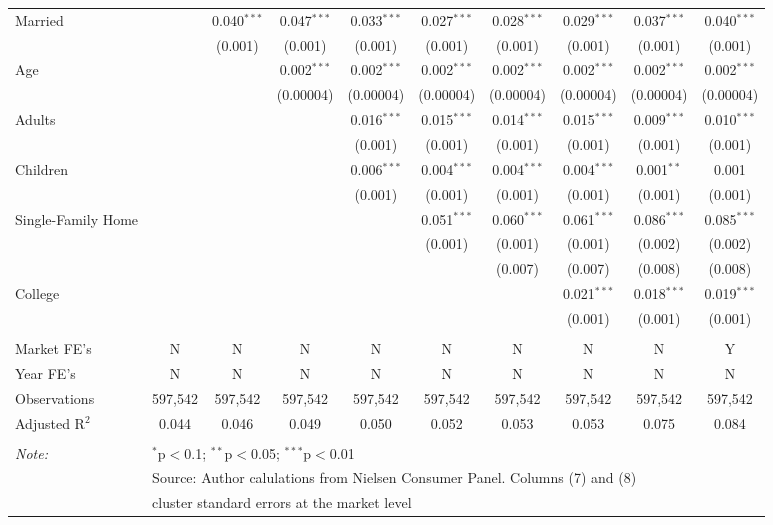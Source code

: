 \begin{table}[!htbp]
\begin{tabular}{@{\extracolsep{5pt}}lccccccccc}
  Married &  & 0.040$^{***}$ & 0.047$^{***}$ & 0.033$^{***}$ & 0.027$^{***}$ & 0.028$^{***}$ & 0.029$^{***}$ & 0.037$^{***}$ & 0.040$^{***}$ \\ 
  &  & (0.001) & (0.001) & (0.001) & (0.001) & (0.001) & (0.001) & (0.001) & (0.001) \\ 
  Age &  &  & 0.002$^{***}$ & 0.002$^{***}$ & 0.002$^{***}$ & 0.002$^{***}$ & 0.002$^{***}$ & 0.002$^{***}$ & 0.002$^{***}$ \\ 
  &  &  & (0.00004) & (0.00004) & (0.00004) & (0.00004) & (0.00004) & (0.00004) & (0.00004) \\ 
  Adults &  &  &  & 0.016$^{***}$ & 0.015$^{***}$ & 0.014$^{***}$ & 0.015$^{***}$ & 0.009$^{***}$ & 0.010$^{***}$ \\ 
  &  &  &  & (0.001) & (0.001) & (0.001) & (0.001) & (0.001) & (0.001) \\ 
  Children &  &  &  & 0.006$^{***}$ & 0.004$^{***}$ & 0.004$^{***}$ & 0.004$^{***}$ & 0.001$^{**}$ & 0.001 \\ 
  &  &  &  & (0.001) & (0.001) & (0.001) & (0.001) & (0.001) & (0.001) \\ 
  Single-Family Home &  &  &  &  & 0.051$^{***}$ & 0.060$^{***}$ & 0.061$^{***}$ & 0.086$^{***}$ & 0.085$^{***}$ \\ 
  &  &  &  &  & (0.001) & (0.001) & (0.001) & (0.002) & (0.002) \\ 
  &  &  &  &  &  & (0.007) & (0.007) & (0.008) & (0.008) \\ 
  College &  &  &  &  &  &  & 0.021$^{***}$ & 0.018$^{***}$ & 0.019$^{***}$ \\ 
  &  &  &  &  &  &  & (0.001) & (0.001) & (0.001) \\ 
 \hline \\[-1.8ex] 
Market FE's & N & N & N & N & N & N & N & N & Y \\ 
Year FE's & N & N & N & N & N & N & N & N & N \\ 
Observations & 597,542 & 597,542 & 597,542 & 597,542 & 597,542 & 597,542 & 597,542 & 597,542 & 597,542 \\ 
Adjusted R$^{2}$ & 0.044 & 0.046 & 0.049 & 0.050 & 0.052 & 0.053 & 0.053 & 0.075 & 0.084 \\ 
\hline 
\hline \\[-1.8ex] 
\textit{Note:}  & \multicolumn{9}{l}{$^{*}$p$<$0.1; $^{**}$p$<$0.05; $^{***}$p$<$0.01} \\ 
 & \multicolumn{9}{l}{Source: Author calulations from Nielsen Consumer Panel. Columns (7) and (8) } \\ 
 & \multicolumn{9}{l}{cluster standard errors at the market level} \\ 
\end{tabular} 
\end{table} 
